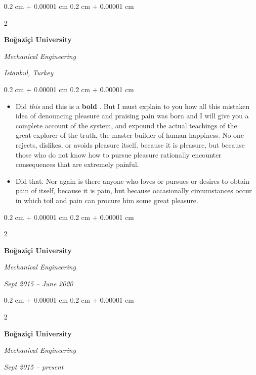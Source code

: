 \documentclass[10pt, letterpaper]{article}
\newenvironment{highlights}{
    \begin{itemize}[
        topsep=0.10 cm,
        parsep=0.10 cm,
        partopsep=0pt,
        itemsep=0pt,
        leftmargin=0.4 cm + 10pt
    ]
}{
    \end{itemize}
} %
\newenvironment{onecolentry}{
    \begin{adjustwidth}{
        0.2 cm + 0.00001 cm
    }{
        0.2 cm + 0.00001 cm
    }
}{
    \end{adjustwidth}
} %
\newenvironment{twocolentry}[2][]{
    \onecolentry
    \def\secondColumn{#2}
    \setcolumnwidth{\fill, 4.5 cm}
    \begin{paracol}{2}
}{
    \switchcolumn \raggedleft \secondColumn
    \end{paracol}
    \endonecolentry
} %
\let\hrefWithoutArrow\href
\renewcommand{\href}[2]{\hrefWithoutArrow{#1}{\ifthenelse{\equal{#2}{}}{ }{#2 }\raisebox{.15ex}{\footnotesize \faExternalLink*}}}
\begin{document}
        \vspace{0.2 cm}

        \begin{twocolentry}{
        \textit{Istanbul, Turkey}    
            
        }
            \textbf{Boğaziçi University}

            \textit{Mechanical Engineering}
        \end{twocolentry}

        \vspace{0.10 cm}
        \begin{onecolentry}
            \begin{highlights}
                \item Did \textit{this} and this is a \textbf{bold} \href{https://example.com}{link}. But I must explain to you how all this mistaken idea of denouncing pleasure and praising pain was born and I will give you a complete account of the system, and expound the actual teachings of the great explorer of the truth, the master-builder of human happiness. No one rejects, dislikes, or avoids pleasure itself, because it is pleasure, but because those who do not know how to pursue pleasure rationally encounter consequences that are extremely painful.
                \item Did that. Nor again is there anyone who loves or pursues or desires to obtain pain of itself, because it is pain, but because occasionally circumstances occur in which toil and pain can procure him some great pleasure.
            \end{highlights}
        \end{onecolentry}


        \vspace{0.2 cm}

        \begin{twocolentry}{
            
            
        \textit{Sept 2015 – June 2020}}
            \textbf{Boğaziçi University}

            \textit{Mechanical Engineering}
        \end{twocolentry}



        \vspace{0.2 cm}

        \begin{twocolentry}{
            
            
        \textit{Sept 2015 – present}}
            \textbf{Boğaziçi University}

            \textit{Mechanical Engineering}
        \end{twocolentry}
\end{document}
